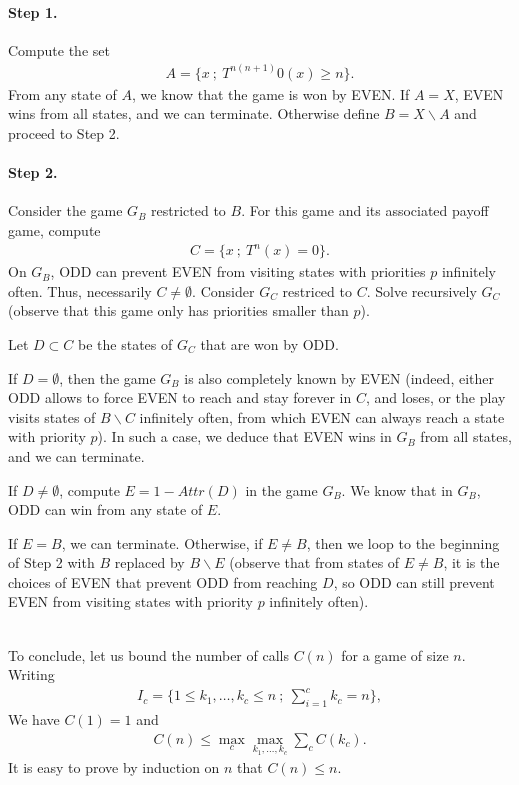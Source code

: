 \documentclass{article}
\begin{document}
\paragraph{Step 1.}
Compute the set
\begin{align}
  A = \{ x ~;~ T^{n(n+1)} 0(x) \ge n \}.
\end{align}
From any state of $A$, we know that the game is won by EVEN. If $A=X$, EVEN wins from all states, and we can terminate. Otherwise define $B=X \backslash A$ and proceed to Step 2.

\paragraph{Step 2.}
Consider the game $G_B$ restricted to $B$. For this game and its associated payoff game, compute
\begin{align}
C = \{ x ~;~ T^n(x) = 0 \}.
\end{align}
On $G_B$, ODD can prevent EVEN from  visiting states with priorities $p$ infinitely often. Thus, necessarily $C \neq \emptyset$. Consider $G_C$ restriced to $C$. Solve recursively $G_C$ (observe that this game only has priorities smaller than $p$).

Let $D \subset C$ be the states of $G_C$ that are won by ODD.

If $D = \emptyset$, then the game $G_B$ is also completely known by EVEN (indeed, either ODD allows to force EVEN to reach and stay forever in $C$, and loses, or the play visits states of $B \backslash C$ infinitely often, from which EVEN can always reach a state with priority $p$). In such a case, we deduce that EVEN wins in $G_B$ from all states, and we can terminate. 

If $D \neq \emptyset$, compute $E=1-Attr(D)$ in the game $G_B$. We know that in $G_B$, ODD can win from any state of $E$.

If $E=B$, we can terminate. Otherwise, if $E \neq B$, then we loop to the beginning of Step 2 with $B$ replaced by $B \backslash E$ (observe that from states of $E \neq B$, it is the choices of EVEN that prevent ODD from reaching $D$, so ODD can still prevent EVEN from visiting states with priority $p$ infinitely often). 

~\\

To conclude, let us bound the number of calls $C(n)$ for a game of size $n$. Writing
\begin{align}
  I_c = \{ 1 \le k_1, \dots, k_c \le n ~;~ \sum_{i=1}^c k_c=n \},
\end{align}
We have $C(1)=1$ and
\begin{align}
  C(n) \le \max_c \max_{k_1,\dots,k_c} \sum_c C(k_c).
\end{align}
It is easy to prove by induction on $n$ that $C(n)\le n$.





 
\end{document}
